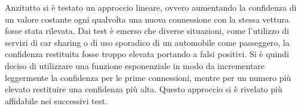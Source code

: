 Anzitutto si è testato un approccio lineare, ovvero aumentando la confidenza di un valore costante ogni qualvolta una nuova connessione con la stessa vettura fosse stata rilevata. Dai test è emerso che diverse situazioni, come l'utilizzo di servizi di car sharing o di uso sporadico di un automobile come passeggero, la confidenza restituita fosse troppo elevata portando a falsi positivi. Si è quindi deciso di utilizzare una funzione esponenziale in modo da incrementare leggermente la confidenza per le prime connessioni, mentre per un numero più elevato restituire una confidenza più alta. Questo approccio si è rivelato più affidabile nei successivi test.

